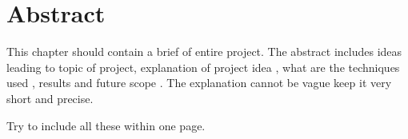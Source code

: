\chapter*{Abstract}%
%

\par This chapter should contain a brief of entire project. The abstract includes ideas leading to topic of project, explanation of project idea , what are the techniques used , results and future scope . The explanation cannot be vague keep it very short and precise.

\par Try to include all these within one page.

\thispagestyle{plain}

